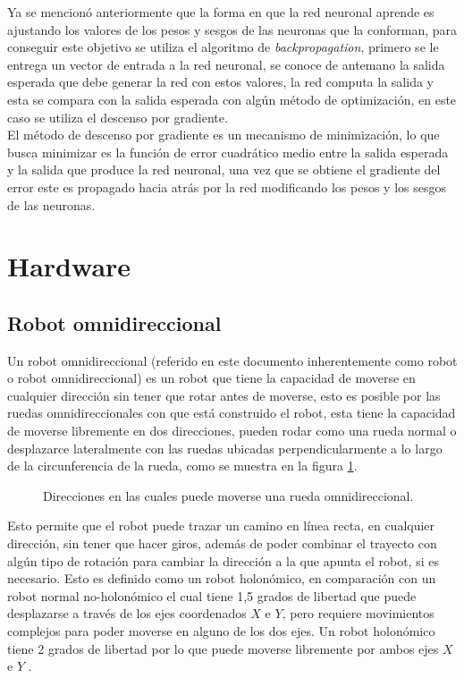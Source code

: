 \documentclass{iccmemoria}
\begin{document}
Ya se mencionó anteriormente que la forma en que la red neuronal aprende es ajustando los valores de los pesos y sesgos de las neuronas que la conforman, para conseguir este objetivo se utiliza el algoritmo de \emph{backpropagation}, primero se le entrega un vector de entrada a la red neuronal, se conoce de antemano la salida esperada que debe generar la red con estos valores, la red computa la salida y esta se compara con la salida esperada con algún método de optimización, en este caso se utiliza el descenso por gradiente.\\

El método de descenso por gradiente es un mecanismo de minimización, lo que busca minimizar es la función de error cuadrático medio entre la salida esperada y la salida que produce la red neuronal, una vez que se obtiene el gradiente del error este es propagado hacia atrás por la red modificando los pesos y los sesgos de las neuronas.

\section{Hardware}

\subsection{Robot omnidireccional}

Un robot omnidireccional (referido en este documento inherentemente como robot o robot omnidireccional) es un robot que tiene la capacidad de moverse en cualquier dirección sin tener que rotar antes de moverse, esto es posible por las ruedas omnidireccionales con que está construido el robot, esta tiene la capacidad de moverse libremente en dos direcciones, pueden rodar como una rueda normal o desplazarce lateralmente con las ruedas ubicadas perpendicularmente a lo largo de la circunferencia de la rueda, como se muestra en la figura \ref{fig:image_omni_whell}.\\

\begin{figure}[H]
  \centering
  
  \caption{Direcciones en las cuales puede moverse una rueda omnidireccional.}
  \label{fig:image_omni_whell}
\end{figure}


Esto permite que el robot puede trazar un camino en línea recta, en cualquier dirección, sin tener que hacer giros, además de poder combinar el trayecto con algún tipo de rotación para cambiar la dirección a la que apunta el robot, si es necesario. Esto es definido como un robot holonómico, en comparación con un robot normal no-holonómico el cual tiene 1,5 grados de libertad que puede desplazarse a través de los ejes coordenados $X$ e $Y$, pero requiere movimientos complejos para poder moverse en alguno de los dos ejes. Un robot holonómico tiene 2 grados de libertad por lo que puede moverse libremente por ambos ejes $X$ e $Y$ \cite{jayakody2015omnirobot}.\\
\end{document}
